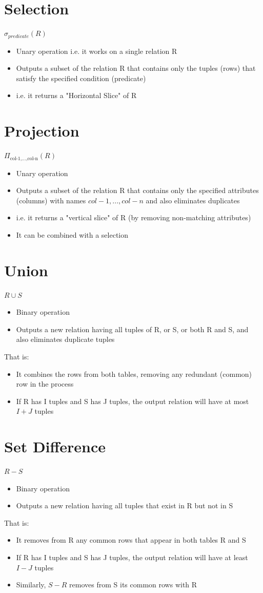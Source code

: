 \documentclass{article}[18pt]
\begin{document}
\section{Selection}
$\sigma_{predicate}(R)$
\begin{itemize}
	\item Unary operation i.e. it works on a single relation R
	\item Outputs a subset of the relation R that contains only the tuples (rows) that satisfy the specified condition (predicate)
	\item i.e. it returns a "Horizontal Slice" of R
\end{itemize}
\section{Projection}
$\Pi_{\text{col-1,...,col-n}}(R)$
\begin{itemize}
	\item Unary operation
	\item Outputs a subset of the relation R that contains only the specified attributes (columns) with names $col-1,...,col-n$ and also eliminates duplicates
	\item i.e. it returns a "vertical slice" of R (by removing non-matching attributes)
	\item It can be combined with a selection
\end{itemize}
\section{Union}
$R\cup S$
\begin{itemize}
	\item Binary operation
	\item Outputs a new relation having all tuples of R, or S, or both R and S, and also eliminates duplicate tuples
\end{itemize}
That is:
\begin{itemize}
	\item It combines the rows from both tables, removing any redundant (common) row in the process
	\item If R has I tuples and S has J tuples, the output relation will have at most $I+J$ tuples
\end{itemize}
\section{Set Difference}
$R-S$
\begin{itemize}
	\item Binary operation
	\item Outputs a new relation having all tuples that exist in R but not in S
\end{itemize}
That is:
\begin{itemize}
	\item It removes from R any common rows that appear in both tables R and S
	\item If R has I tuples and S has J tuples, the output relation will have at least $I-J$ tuples
	\item Similarly, $S-R$ removes from S its common rows with R
\end{itemize}
\end{document}
